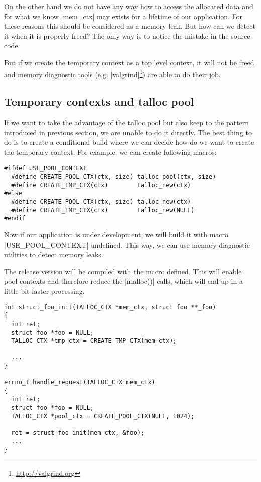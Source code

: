 On the other hand we do not have any way how to access the allocated data
and for what we know |mem_ctx| may exists for a lifetime of our application.
For these reasons this should be considered as a memory leak. But how can we
detect it when it is properly freed? The only way is to notice the mistake in
the source code.

But if we create the temporary context as a top level context, it will not be
freed and memory diagnostic tools
(e.g. |valgrind|\footnote{\url{http://valgrind.org}}) are able to do their job.

\subsection{Temporary contexts and talloc pool}
\label{talloc:subsec:tmp-ctx-and-pool}

If we want to take the advantage of the talloc pool but also keep to the
pattern introduced in previous section, we are unable to do it directly. The
best thing to do is to create a conditional build where we can decide how do we
want to create the temporary context. For example, we can create following
macros:

\begin{lstlisting}[caption={Conditional temporary context
macros},label=lst:tmp-ctx-4]
#ifdef USE_POOL_CONTEXT
  #define CREATE_POOL_CTX(ctx, size) talloc_pool(ctx, size)
  #define CREATE_TMP_CTX(ctx)        talloc_new(ctx)
#else
  #define CREATE_POOL_CTX(ctx, size) talloc_new(ctx)
  #define CREATE_TMP_CTX(ctx)        talloc_new(NULL)
#endif
\end{lstlisting}

Now if our application is under development, we will build it with macro
|USE_POOL_CONTEXT| undefined. This way, we  can use memory diagnostic
utilities to detect memory leaks.

The release version will be compiled with the macro defined. This will  enable
pool contexts and therefore reduce the |malloc()| calls, which will end up in a
little bit faster processing.

\begin{lstlisting}[caption={Conditional temporary context},label=lst:tmp-ctx-5]
int struct_foo_init(TALLOC_CTX *mem_ctx, struct foo **_foo)
{
  int ret;
  struct foo *foo = NULL;
  TALLOC_CTX *tmp_ctx = CREATE_TMP_CTX(mem_ctx);

  ...
}

errno_t handle_request(TALLOC_CTX mem_ctx)
{
  int ret;
  struct foo *foo = NULL;
  TALLOC_CTX *pool_ctx = CREATE_POOL_CTX(NULL, 1024);
  
  ret = struct_foo_init(mem_ctx, &foo);
  ...
}
\end{lstlisting}